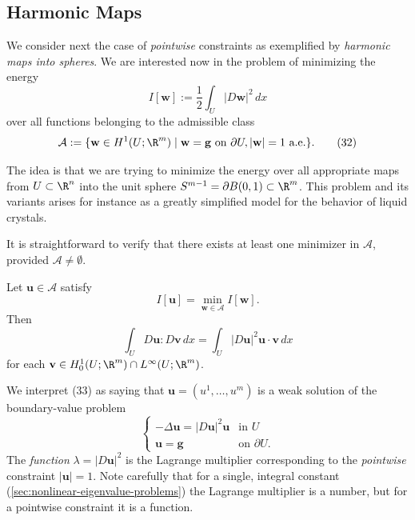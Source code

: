 \subsection{Harmonic Maps}
\label{sec:harmonic-maps-pointwise-constraints}

We consider next the case of \textit{pointwise} constraints as exemplified by \textit{harmonic maps into spheres}. We are interested now in the problem of minimizing the energy
\[
I[\mathbf{w}] := \frac{1}{2}\int_U |D\mathbf{w}|^2\, dx
\tag{31}
\]
over all functions belonging to the admissible class
\[
\mathcal{A} := \{\mathbf{w} \in H^1(U;\R^m) \mid \mathbf{w} = \mathbf{g} \text{ on } \partial U, |\mathbf{w}| = 1 \text{ a.e.}\}.
\tag{32}
\]

\begin{figure}[h]\centering
\end{figure}

The idea is that we are trying to minimize the energy over all appropriate maps from $U \subset \R^n$ into the unit sphere $S^{m-1} = \partial B(0,1) \subset \R^m$. This problem and its variants arises for instance as a greatly simplified model for the behavior of liquid crystals.

It is straightforward to verify that there exists at least one minimizer in $\mathcal{A}$, provided $\mathcal{A} \neq \emptyset$.

\begin{theorem}
\label{thm:euler-lagrange-harmonic-maps}
Let $\mathbf{u} \in \mathcal{A}$ satisfy
\[
I[\mathbf{u}] = \min_{\mathbf{w} \in \mathcal{A}} I[\mathbf{w}].
\]
Then
\[
\int_U D\mathbf{u} : D\mathbf{v}\, dx = \int_U |D\mathbf{u}|^2 \mathbf{u} \cdot \mathbf{v}\, dx
\tag{33}
\]
for each $\mathbf{v} \in H_0^1(U;\R^m) \cap L^\infty(U;\R^m)$.
\end{theorem}

\begin{remark}
\label{rem:harmonic-maps-lagrange-multiplier-function}
We interpret (33) as saying that $\mathbf{u} = (u^1, \ldots, u^m)$ is a weak solution of the boundary-value problem
\[
\begin{cases} -\Delta \mathbf{u} = |D\mathbf{u}|^2 \mathbf{u} & \text{in } U \\ \mathbf{u} = \mathbf{g} & \text{on } \partial U. \end{cases}
\tag{34}
\]
The \textit{function} $\lambda = |D\mathbf{u}|^2$ is the Lagrange multiplier corresponding to the \textit{pointwise} constraint $|\mathbf{u}| = 1$. Note carefully that for a single, integral constant (\cref{sec:nonlinear-eigenvalue-problems}) the Lagrange multiplier is a number, but for a pointwise constraint it is a function.
\end{remark}

